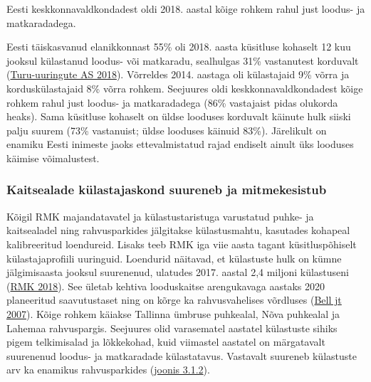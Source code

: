 \documentclass[estonian,]{article}
\begin{document}
\begin{blockquote-left}
Eesti keskkonnavaldkondadest oldi 2018. aastal kõige rohkem rahul just
loodus- ja matkaradadega.
\end{blockquote-left}

Eesti täiskasvanud elanikkonnast 55\% oli 2018. aasta küsitluse kohaselt 12 kuu jooksul külastanud loodus- või matkaradu, sealhulgas 31\% vastanutest korduvalt (\protect\hyperlink{Turu-uuringute2018}{Turu-uuringute AS 2018}). Võrreldes 2014. aastaga oli külastajaid 9\% võrra ja korduskülastajaid 8\% võrra rohkem. Seejuures oldi keskkonnavaldkondadest kõige rohkem rahul just loodus- ja matkaradadega (86\% vastajaist pidas olukorda heaks). Sama küsitluse kohaselt on üldse looduses korduvalt käinute hulk siiski palju suurem (73\% vastanuist; üldse looduses käinuid 83\%). Järelikult on enamiku Eesti inimeste jaoks ettevalmistatud rajad endiselt ainult üks looduses käimise võimalustest.

\hypertarget{kaitsealade-kuxfclastajaskond-suureneb-ja-mitmekesistub}{%
\subsubsection*{Kaitsealade külastajaskond suureneb ja mitmekesistub}\label{kaitsealade-kuxfclastajaskond-suureneb-ja-mitmekesistub}}

Kõigil RMK majandatavatel ja külastustaristuga varustatud puhke- ja kaitsealadel ning rahvusparkides jälgitakse külastusmahtu, kasutades kohapeal kalibreeritud loendureid. Lisaks teeb RMK iga viie aasta tagant küsitluspõhiselt külastajaprofiili uuringuid. Loendurid näitavad, et külastuste hulk on kümne jälgimisaasta jooksul suurenenud, ulatudes 2017. aastal 2,4 miljoni külastuseni (\protect\hyperlink{RMK2018}{RMK 2018}). See ületab kehtiva looduskaitse arengukavaga aastaks 2020 planeeritud saavutustaset ning on kõrge ka rahvusvahelises võrdluses (\protect\hyperlink{Bell2007}{Bell jt 2007}). Kõige rohkem käiakse Tallinna ümbruse puhkealal, Nõva puhkealal ja Lahemaa rahvuspargis. Seejuures olid varasematel aastatel külastuste sihiks pigem telkimisalad ja lõkkekohad, kuid viimastel aastatel on märgatavalt suurenenud loodus- ja matkaradade külastatavus. Vastavalt suureneb külastuste arv ka enamikus rahvusparkides (\protect\hyperlink{figure132}{joonis 3.1.2}).
\end{document}
